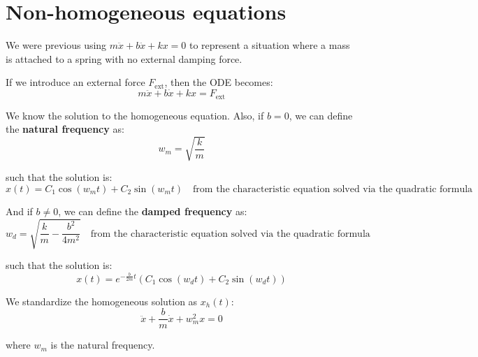 \section{Non-homogeneous equations}

We were previous using $m\ddot x + b \ddot x + kx = 0$ to represent a situation where a mass is attached to a spring with no external damping force.

If we introduce an external force $F_{\text{ext}}$, then the ODE becomes:
\begin{equation*}
m \ddot x + b \dot x + k x = F_{\text{ext}}
\end{equation*}

We know the solution to the homogeneous equation. Also, if $b=0$, we can define the \textbf{natural frequency} as:
\begin{equation*}
w_m = \sqrt{\frac{k}{m}}
\end{equation*}

such that the solution is:
\begin{equation*}
x(t) = C_1 \cos(w_m t) + C_2 \sin(w_m t) \quad \text{from the characteristic equation solved via the quadratic formula}
\end{equation*}

And if $b \neq 0$, we can define the \textbf{damped frequency} as:
\begin{equation*}
w_d = \sqrt{\frac{k}{m} - \frac{b^2}{4 m^2}} \quad \text{from the characteristic equation solved via the quadratic formula}
\end{equation*}

such that the solution is:
\begin{equation*}
x(t) = e^{-\frac{b}{2m} t} (C_1 \cos(w_d t) + C_2 \sin(w_d t))
\end{equation*}

We standardize the homogeneous solution as $x_h(t)$:
\begin{equation*}
\ddot x + \frac{b}{m} \dot x + w_m^2 x = 0
\end{equation*}

where $w_m$ is the natural frequency.

